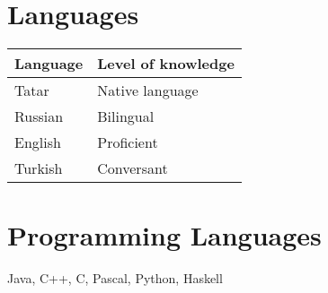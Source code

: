 \documentclass[11pt,a4paper,oneside]{article}
\begin{document}
\section{Languages}
\begin{center}  
    \begin{tabular}{l|l}
        Language&Level of knowledge \\
        \hline
        Tatar&Native language \\
        Russian&Bilingual \\ 
        English&Proficient \\
        Turkish&Conversant \\
    \end{tabular}
\end{center}
\section{Programming Languages}
    Java, C++, C, Pascal, Python, Haskell
\end{document}
